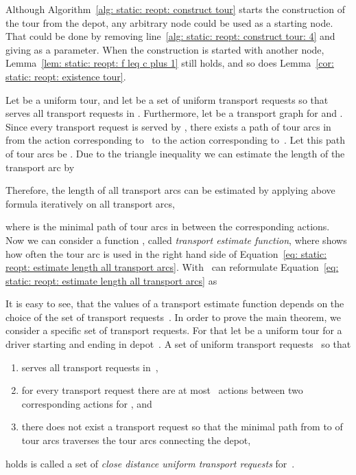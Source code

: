 \documentclass[english]{llncs}
\numberwithin{sublemma}{lemma}
\begin{document}
\begin{remark} \label{rem: static: reopt: arbitrary start node}
  Although Algorithm~\ref{alg: static: reopt: construct tour} starts the construction of the tour from the depot, any arbitrary node could be used as a starting node.
  That could be done by removing line~\ref{alg: static: reopt: construct tour: 4} and giving  as a parameter.
  When the construction is started with another node, Lemma~\ref{lem: static: reopt: f leq c plus 1} still holds, and so does Lemma~\ref{cor: static: reopt: existence tour}.
\end{remark}






Let  be a uniform tour, and let  be a set of uniform transport requests so that  serves all transport requests in .
Furthermore, let  be a transport graph for  and .
Since every transport request  is served by , there exists a path of tour arcs in  from the action  corresponding to~ to the action  corresponding to~.
Let this path of tour arcs be .
Due to the triangle inequality we can estimate the length  of the transport arc by

Therefore, the length of all transport arcs can be estimated by applying above formula iteratively on all transport arcs,

where  is the minimal path of tour arcs in  between the corresponding actions.
Now we can consider a function , called \emph{transport estimate function},
where  shows how often the tour arc  is used in the right hand side of Equation~\eqref{eq: static: reopt: estimate length all transport arcs}.
With~ can reformulate Equation~\eqref{eq: static: reopt: estimate length all transport arcs} as




It is easy to see, that the values of a transport estimate function depends on the choice of the set of transport requests~.
In order to prove the main theorem, we consider a specific set of transport requests.
For that let  be a uniform tour for a driver starting and ending in depot~.
A set of uniform transport requests~ so that
\begin{enumerate}
  \item \label{lem: static: reopt: existence tour: i}    serves all transport requests in~,
  \item \label{lem: static: reopt: existence tour: ii}  for every transport request  there are at most~ actions between two corresponding actions for , and
  \item \label{lem: static: reopt: existence tour: iii} there does not exist a transport request  so that the minimal path
                                                        from  to  of tour arcs traverses the tour arcs connecting the depot,
\end{enumerate}
holds is called a set of \emph{close distance uniform transport requests} for~.
\end{document}
